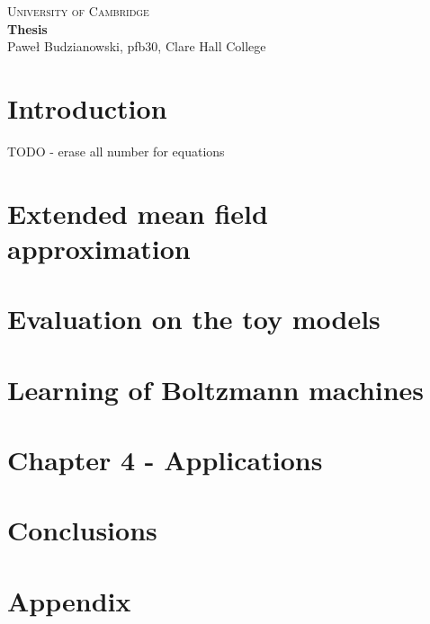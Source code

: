\documentclass[a4paper]{article}
\begin{document}
\begin{center}
\Large{\textsc{
University of Cambridge}}\\
\vspace{.5cm}
\large\textbf{Thesis}\\
\vspace{.5cm}
\large{Paweł Budzianowski, pfb30, Clare Hall College}\\
\end{center} 

\tableofcontents

\newpage
\section{Introduction}
%
TODO - erase all number for equations

\newpage
\section{Extended mean field approximation}


\newpage
\section{Evaluation on the toy models}


\newpage
\section{Learning of Boltzmann machines}


\newpage
\section{Chapter 4 - Applications}


\newpage
\section{Conclusions}
%




\newpage
\section{Appendix}




%
%



\end{document}
